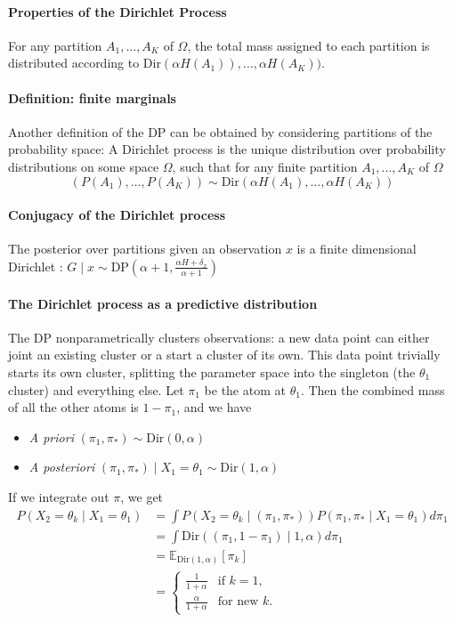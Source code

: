 \documentclass[twoside]{article}
\newcommand{\Dir}{\mathrm{Dir}}
\newcommand{\DP}{\mathrm{DP}}
\newcommand{\todo}[1]{{\color{red} TODO: #1}}
\begin{document}
\paragraph{Properties of the Dirichlet Process}
For any partition $A_1,...,A_K$ of $\Omega$, the total mass assigned to each partition is distributed according to $\Dir(\alpha H(A_1)),\ldots, \alpha H(A_K))$.


\paragraph{Definition: finite marginals}
Another definition of the DP can be obtained by considering partitions of the probability space: A Dirichlet process is the unique distribution over probability distributions on some space $\Omega$, such that for any finite partition $A_1,...,A_K$ of $\Omega$
\[
\left( P(A_1),\ldots, P(A_K) \right) \sim \Dir{\left( \alpha H(A_1),\ldots, \alpha H(A_K) \right)}
\]

\paragraph{Conjugacy of the Dirichlet process}
The posterior over partitions given an observation $x$ is a finite dimensional Dirichlet :
$ G \mid x \sim \DP(\alpha+1, \frac{\alpha H + \delta_x}{\alpha + 1})$

\paragraph{The Dirichlet process as a predictive distribution}

The DP nonparametrically clusters observations: a new data point can either joint an existing cluster or a start a cluster of its own.  This data point trivially starts its own cluster, splitting the parameter space into the singleton (the $\theta_1$ cluster) and everything else.  Let $\pi_1$ be the atom at $\theta_1$.  Then the combined mass of all the other atoms is $1 - \pi_1$, and we have
\begin{itemize}
\item \emph{A priori} $(\pi_1,\pi_*) \sim \Dir(0,\alpha)$
\item \emph{A posteriori} $(\pi_1,\pi_*) \mid X_1 = \theta_1 \sim \Dir(1,\alpha)$
\end{itemize}

If we integrate out $\pi$, we get
\begin{align*}
   P(X_2 = \theta_k \mid X_1 = \theta_1)
&= \int P(X_2 = \theta_k \mid (\pi_1,\pi_*)) P(\pi_1,\pi_* \mid X_1=\theta_1) d\pi_1  \\
&= \int \Dir((\pi_1,1-\pi_1) \mid 1,\alpha) d\pi_1 \\
&= \mathbb{E}_{\Dir(1,\alpha)}[\pi_k] \\
&= \begin{cases}
    \frac{1}{1+\alpha} & \text{if } k=1,\\
    \frac{\alpha}{1+\alpha} & \text{for new } k.
\end{cases}
\end{align*}
\end{document}
